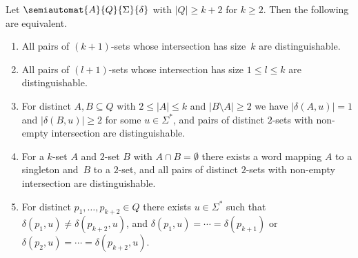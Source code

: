 \begin{proposition} \label{aut-sync-words:dist-sets:prop:intersection-k-sets}
	Let $\semiautomat{A}{Q}{\Sigma}{\delta}$ with 
	$|Q| \ge k+2$ for $k \ge 2$. Then the following are equivalent.
	
	\begin{enumerate}	
		\item \label{aut-sync-words:dist-sets:prop:intersection-k-sets:2} All pairs of $(k+1)$-sets
		whose intersection has size~$k$	are distinguishable.		
	
	\item \label{aut-sync-words:dist-sets:prop:intersection-k-sets:1} All pairs of $(l+1)$-sets
	whose intersection has size $1 \le l \le k$ are distinguishable.	
		
		\item \label{aut-sync-words:dist-sets:prop:intersection-k-sets:4} For distinct $A,B \subseteq Q$
		with $2 \le |A| \le k$ and $|B \setminus A| \ge 2$
		we have $|\delta(A, u)| = 1$ and $|\delta(B, u)| \ge 2$ for some $u \in \Sigma^*$,
		and pairs of distinct $2$-sets with non-empty intersection are distinguishable.
		
		\item \label{aut-sync-words:dist-sets:prop:intersection-k-sets:5} For a $k$-set $A$ and $2$-set $B$
		with $A\cap B = \emptyset$ there exists a word mapping $A$ to a singleton and~$B$ to a $2$-set,
		and all pairs of distinct $2$-sets with non-empty intersection are distinguishable.
		
		\item \label{aut-sync-words:dist-sets:prop:intersection-k-sets:3} For distinct $p_1, \ldots, p_{k+2} \in Q$
		there exists $u \in \Sigma^*$ such that $\delta(p_1, u) \ne \delta(p_{k+2}, u)$,
		and $\delta(p_1, u) = \cdots = \delta(p_{k+1})$	or $\delta(p_2, u) = \cdots = \delta(p_{k+2}, u)$.		
	\end{enumerate}
\end{proposition}
